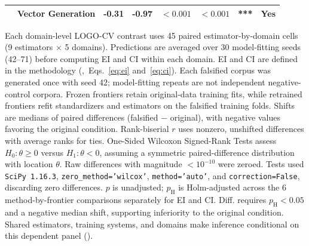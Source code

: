 \documentclass{article}
\begin{document}
\begin{table}[H]
\begin{tabularx}{\linewidth}{@{}l>{\raggedright\arraybackslash}Xrrrrrr@{}}
 & Vector Generation & -0.31 & -0.97 & $<0.001$ & $<0.001$ & *** & Yes \\
\bottomrule
\end{tabularx}
\par\vspace{12pt}
\begin{minipage}{\linewidth}
\footnotesize
Each domain-level LOGO-CV contrast uses 45 paired estimator-by-domain cells (9 estimators $\times$ 5 domains). Predictions are averaged over 30 model-fitting seeds (42--71) before computing EI and CI within each domain. EI and CI are defined in the methodology (,~Eqs.~\eqref{eq:ei} and~\eqref{eq:ci}). Each falsified corpus was generated once with seed 42; model-fitting repeats are not independent negative-control corpora. Frozen frontiers retain original-data training fits, while retrained frontiers refit standardizers and estimators on the falsified training folds. Shifts are medians of paired differences (falsified $-$ original), with negative values favoring the original condition. Rank-biserial $r$ uses nonzero, unshifted differences with average ranks for ties. One-Sided Wilcoxon Signed-Rank Tests assess $H_0:\theta\geq0$ versus $H_1:\theta<0$, assuming a symmetric paired-difference distribution with location $\theta$. Raw differences with magnitude $<10^{-10}$ were zeroed. Tests used \texttt{SciPy 1.16.3}, \texttt{zero\_method='wilcox'}, \texttt{method='auto'}, and \texttt{correction=False}, discarding zero differences. $p$ is unadjusted; $p_{\mathrm H}$ is Holm-adjusted across the 6 method-by-frontier comparisons separately for EI and CI. Diff. requires $p_{\mathrm H}<0.05$ and a negative median shift, supporting inferiority to the original condition. Shared estimators, training systems, and domains make inference conditional on this dependent panel ().
\end{minipage}
\end{table}
\end{document}

